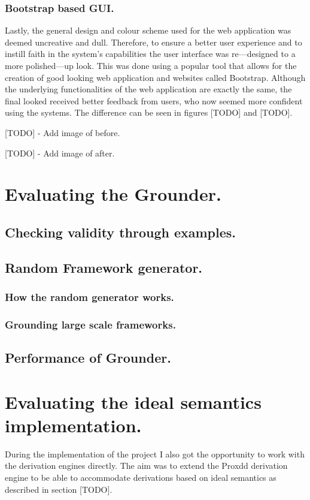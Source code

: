 \subsubsection{Bootstrap based GUI.}
Lastly, the general design and colour scheme used for the web application was deemed uncreative and dull. Therefore, to ensure a better user experience and to instill faith in the system's capabilities the user interface was re---designed to a more polished---up look. This was done using a popular tool that allows for the creation of good looking web application and websites called Bootstrap. Although the underlying functionalities of the web application are exactly the same, the final looked received better feedback from users, who now seemed more confident using the systems. The difference can be seen in figures [TODO] and [TODO].

[TODO] - Add image of before.

[TODO] - Add image of after.

\section{Evaluating the Grounder.}

\subsection{Checking validity through examples.}

\subsection{Random Framework generator.}

\subsubsection{How the random generator works.}

\subsubsection{Grounding large scale frameworks.}

\subsection{Performance of Grounder.}

\section{Evaluating the ideal semantics implementation.}
During the implementation of the project I also got the opportunity to work with the derivation engines directly. The aim was to extend the Proxdd derivation engine to be able to accommodate derivations based on ideal semantics as described in section [TODO].

